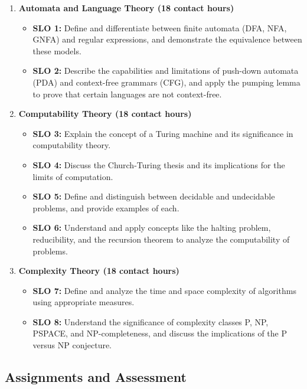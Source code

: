 \documentclass[11pt]{article}
\begin{document}
\begin{enumerate}
    \item \textbf{Automata and Language Theory (18 contact hours)}
        \begin{itemize}
            \item \textbf{SLO 1:} Define and differentiate between finite automata (DFA, NFA, GNFA) and regular expressions, and demonstrate the equivalence between these models.
            \item \textbf{SLO 2:} Describe the capabilities and limitations of push-down automata (PDA) and context-free grammars (CFG), and apply the pumping lemma to prove that certain languages are not context-free.
        \end{itemize}
    \item \textbf{Computability Theory (18 contact hours)}
        \begin{itemize}
            \item \textbf{SLO 3:} Explain the concept of a Turing machine and its significance in computability theory.
            \item \textbf{SLO 4:} Discuss the Church-Turing thesis and its implications for the limits of computation.
            \item \textbf{SLO 5:} Define and distinguish between decidable and undecidable problems, and provide examples of each.
            \item \textbf{SLO 6:} Understand and apply concepts like the halting problem, reducibility, and the recursion theorem to analyze the computability of problems.
        \end{itemize}
    \item \textbf{Complexity Theory (18 contact hours)}
        \begin{itemize}
            \item \textbf{SLO 7:} Define and analyze the time and space complexity of algorithms using appropriate measures.
            \item \textbf{SLO 8:} Understand the significance of complexity classes P, NP, PSPACE, and NP-completeness, and discuss the implications of the P versus NP conjecture.
        \end{itemize}
\end{enumerate}


\subsection*{Assignments and Assessment}
\end{document}
